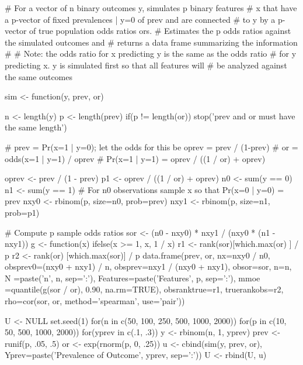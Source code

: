 \begin{Schunk}
\begin{Sinput}
# For a vector of n binary outcomes y, simulates p binary features
# x that have a p-vector of fixed prevalences | y=0 of prev and are connected
# to y by a p-vector of true population odds ratios ors.
# Estimates the p odds ratios against the simulated outcomes and
# returns a data frame summarizing the information
#
# Note: the odds ratio for x predicting y is the same as the odds ratio
# for y predicting x.  y is simulated first so that all features will
# be analyzed against the same outcomes

sim <- function(y, prev, or) {
  n <- length(y)
  p <- length(prev)
  if(p != length(or)) stop('prev and or must have the same length')

  # prev = Pr(x=1 | y=0); let the odds for this be oprev = prev / (1-prev)
  # or = odds(x=1 | y=1) / oprev
  # Pr(x=1 | y=1) = oprev / ((1 / or) + oprev)

  oprev <- prev / (1 - prev)
  p1 <- oprev / ((1 / or) + oprev)
  n0 <- sum(y == 0)
  n1 <- sum(y == 1)
  # For n0 observations sample x so that Pr(x=0 | y=0) = prev
  nxy0 <- rbinom(p, size=n0, prob=prev)
  nxy1 <- rbinom(p, size=n1, prob=p1)

  # Compute p sample odds ratios
  sor <- (n0 - nxy0) * nxy1 / (nxy0 * (n1 - nxy1))
  g <- function(x) ifelse(x >= 1, x, 1 / x)
  r1 <- rank(sor)[which.max(or) ] / p
  r2 <- rank(or) [which.max(sor)] / p
  data.frame(prev, or, nx=nxy0 / n0, obsprev0=(nxy0 + nxy1) / n,
             obsprev=nxy1 / (nxy0 + nxy1), obsor=sor, n=n,
             N       =paste('n', n, sep=':'),
             Features=paste('Features', p, sep=':'),
             mmoe    =quantile(g(sor / or), 0.90, na.rm=TRUE),
             obsranktrue=r1, truerankobs=r2,
             rho=cor(sor, or, method='spearman', use='pair'))
}
\end{Sinput}
\end{Schunk}

\begin{Schunk}
\begin{Sinput}
U <- NULL
set.seed(1)
for(n in c(50, 100, 250, 500, 1000, 2000)) {
  for(p in c(10, 50, 500, 1000, 2000)) {
    for(yprev in c(.1, .3)) {
      y <- rbinom(n, 1, yprev)
      prev <- runif(p, .05, .5)
      or <- exp(rnorm(p, 0, .25))
      u <- cbind(sim(y, prev, or),
                 Yprev=paste('Prevalence of Outcome', yprev, sep=':'))
      U <- rbind(U, u)
    }
  }
}
\end{Sinput}
\end{Schunk}

